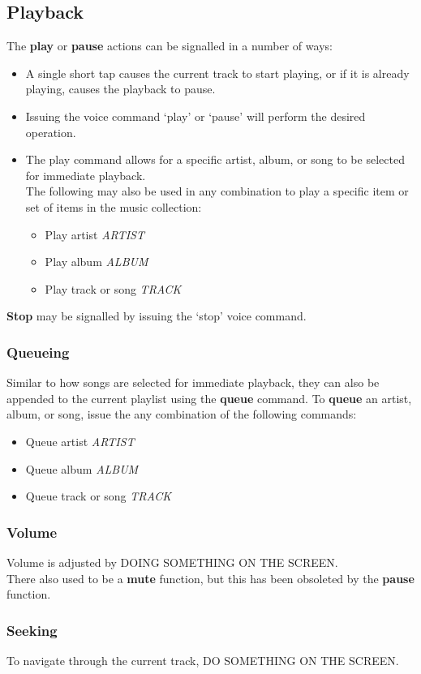 \documentclass[12pt,letterpaper]{article}
\begin{document}
\subsection*{Playback}
The \textbf{play} or \textbf{pause} actions can be signalled in a number of ways:
\begin{itemize}
\item A single short tap causes the current track to start playing, or if it is already playing, causes the playback to pause.
\item Issuing the voice command `play' or `pause' will perform the desired operation.
\item The play command allows for a specific artist, album, or song to be selected for immediate playback. \\ The following may also be used in any combination to play a specific item or set of items in the music collection:
	\begin{itemize}
	\item Play artist \textit{ARTIST}
	\item Play album \textit{ALBUM}
	\item Play track or song \textit{TRACK}
	\end{itemize}
\end{itemize}
\textbf{Stop} may be signalled by issuing the `stop' voice command.
\subsubsection*{Queueing}
Similar to how songs are selected for immediate playback, they can also be appended to the current playlist using the \textbf{queue} command. To \textbf{queue} an artist, album, or song, issue the any combination of the following commands:
	\begin{itemize}
	\item Queue artist \textit{ARTIST}
	\item Queue album \textit{ALBUM}
	\item Queue track or song \textit{TRACK}
	\end{itemize}
\subsubsection*{Volume}
Volume is adjusted by {\color{red} DOING SOMETHING ON THE SCREEN}. \\
{\color{green} There also used to be a \textbf{mute} function, but this has been obsoleted by the \textbf{pause} function.}
\subsubsection*{Seeking}
To navigate through the current track, {\color{red} DO SOMETHING ON THE SCREEN}.
\end{document}
